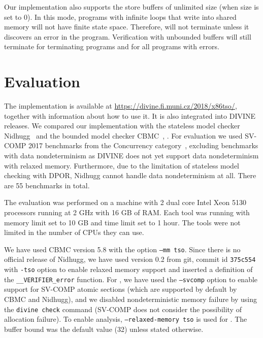 Our implementation also supports the store buffers of unlimited
size (when size is set to 0). In this mode, programs with infinite loops that write into
shared memory will not have finite state space. Therefore, \divine will not
terminate unless it discovers an error in the program. Verification with
unbounded buffers will still terminate for terminating programs and for all
programs with errors.


\section{Evaluation} \label{sec:evaluation}

The implementation is available at \url{https://divine.fi.muni.cz/2018/x86tso/}, together with information about how to use it.
It is also integrated into DIVINE releases.
We compared our implementation with the stateless model checker Nidhugg~ and the bounded model checker CBMC~, .
For evaluation we used SV-COMP 2017 benchmarks from the Concurrency
category~, excluding benchmarks with data
nondeterminism as
DIVINE does not yet support data nondeterminism with relaxed memory.
Furthermore, due to the limitation of stateless model checking with DPOR,
Nidhugg cannot handle data nondeterminism at all.
There are 55 benchmarks in total.

The evaluation was performed on a machine with 2 dual core Intel Xeon 5130
processors running at 2 GHz with 16 GB of RAM. Each tool was running with memory
limit set to 10 GB and time limit set to 1 hour. The tools were not limited in
the number of CPUs they can use.

We have used CBMC version 5.8 with the option \texttt{--mm tso}. Since there is no official release of Nidhugg, we have used version 0.2 from git, commit id
\texttt{375c554} with \texttt{-tso} option to enable relaxed memory support and inserted a definition of the \texttt{\_\_VERIFIER\_error} function.
For \divine, we have used the \texttt{--svcomp} option to enable support for SV-COMP atomic sections (which are supported by default by CBMC and Nidhugg), and we disabled nondeterministic memory failure by using the \texttt{divine check} command (SV-COMP does not consider the possibility of allocation failure).
To enable \xtso analysis, \texttt{--relaxed-memory tso} is used for \divine.
The buffer bound was the default value (32) unless stated otherwise.

